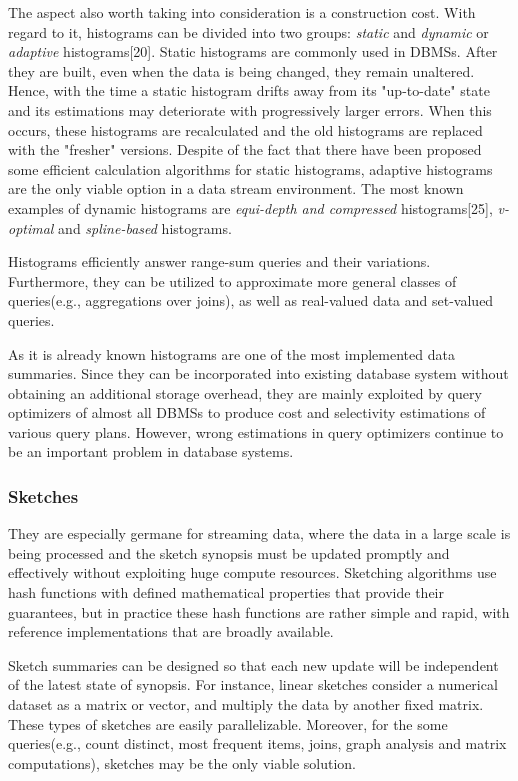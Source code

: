 \documentclass[10pt, conference, compsocconf]{IEEEtran}
\begin{document}
The aspect also worth taking into consideration is a construction cost. With regard to it, histograms can be divided into two groups: \textit{static} and \textit{dynamic} or \textit{adaptive} histograms[20]. Static histograms are commonly used in DBMSs. After they are built, even when the data is being changed, they remain unaltered. Hence, with the time a static histogram drifts away from its "up-to-date" state and its estimations may deteriorate with progressively larger errors. When this occurs, these histograms are recalculated and the old histograms are replaced with the "fresher" versions. 
Despite of the fact that there have been proposed some efficient calculation algorithms for static histograms, adaptive histograms are the only viable option in a data stream environment. The most known examples of dynamic histograms are \textit{equi-depth and compressed} histograms[25], \textit{v-optimal} and \textit{spline-based} histograms. 

Histograms efficiently answer range-sum queries and their variations. Furthermore, they can be utilized to approximate more general classes of queries(e.g., aggregations over joins), as well as real-valued data and set-valued queries.
  
As it is already known histograms are one of the most implemented data summaries. Since they can be incorporated into existing database system without obtaining an additional storage overhead, they are mainly exploited by query optimizers of almost all DBMSs to produce cost and selectivity estimations of various query plans. However, wrong estimations in query optimizers continue to be an important problem in database systems.\\

\subsubsection{\textbf{Sketches}}

They are especially germane for streaming data, where the data in a large scale is being processed and the sketch synopsis must be updated promptly and effectively without exploiting huge compute resources. Sketching algorithms use hash functions with defined mathematical properties that provide their guarantees, but in practice these hash functions are rather simple and rapid, with reference implementations that are broadly available.  

Sketch summaries can be designed so that each new update will be independent of the latest state of synopsis. For instance, linear sketches consider a numerical dataset as a matrix or vector, and multiply the data by another fixed matrix. These types of sketches are easily parallelizable. Moreover, for the some queries(e.g., count distinct, most frequent items, joins, graph analysis and matrix computations), sketches may be the only viable solution.
\end{document}
